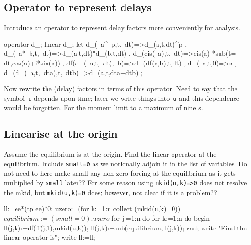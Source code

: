 \documentclass[11pt,a5paper]{article}
\begin{document}
\subsection{Operator to represent delays}

Introduce an operator to represent delay factors more conveniently for analysis.
\begin{reduce}
operator d_; linear d_;
let { d_(~a^~p,t,~dt)=>d_(a,t,dt)^p
    , d_(~a*~b,t,~dt)=>d_(a,t,dt)*d_(b,t,dt)
    , d_(cis(~a),t,~dt)=>cis(a)
        *sub(t=-dt,cos(a)+i*sin(a))
    , df(d_(~a,t,~dt),~b)=>d_(df(a,b),t,dt)
    , d_(~a,t,0)=>a
    , d_(d_(~a,t,~dta),t,~dtb)=>d_(a,t,dta+dtb)
    };
\end{reduce}

Now rewrite the (delay) factors in terms of this operator.
Need to say that the symbol~\verb|u| depends upon time; later we write things into~\verb|u| and this dependence would be forgotten.
For the moment limit to a maximum of nine \ode{}s.


\subsection{Linearise at the origin}
Assume the equilibrium is at the origin.
Find the linear operator at the equilibrium.
Include \verb|small=0| as we notionally adjoin it in the list of variables.
Do not need to here make small any non-zero forcing at the equilibrium as it gets multiplied by \verb|small| later??
For some reason using \verb|mkid(u,k)=>0| does not resolve the mkid, but \verb|mkid(u,k)=0| does; however, not clear if it is a problem??

\begin{reduce}
ll:=ee*(tp ee)*0; %
uzero:=(for k:=1:n collect (mkid(u,k)=0))$
equilibrium:=(small=0).uzero$
for j:=1:n do for k:=1:n do begin 
  ll(j,k):=df(ff(j,1),mkid(u,k));
  ll(j,k):=sub(equilibrium,ll(j,k));
end;
write "Find the linear operator is";
write ll:=ll;
\end{reduce}
\end{document}
